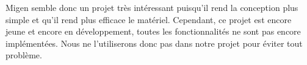 Migen semble donc un projet très intéressant puisqu'il rend la conception plus simple et qu'il rend plus efficace le matériel. Cependant, ce projet est encore jeune et encore en développement, toutes les fonctionnalités ne sont pas encore implémentées. Nous ne l'utiliserons donc pas dans notre projet pour éviter tout problème.
